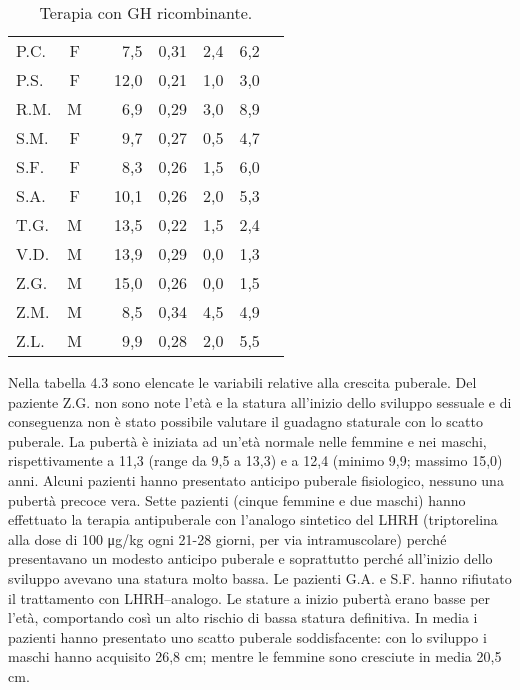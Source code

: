\begin{table}[!h]
\begin{center}
\begin{tabular}{lccrcccl}
P.C.	& F &  		 & 7,5   	&  0,31     	& 2,4                 & 6,2  \\
P.S.	& F &  		 & 12,0  	&  0,21     	& 1,0                 & 3,0  \\
R.M.	& M & \checkmark & 6,9   	&  0,29     	& 3,0                 & 8,9  \\
S.M.	& F &  	  	 & 9,7   	&  0,27     	& 0,5                 & 4,7  \\
S.F.	& F &  		 & 8,3   	&  0,26     	& 1,5                 & 6,0  \\
S.A.	& F &  		 & 10,1  	&  0,26     	& 2,0                 & 5,3  \\
T.G.    & M &            & 13,5         &  0,22         & 1,5                 & 2,4  \\
V.D.	& M &  		 & 13,9  	&  0,29     	& 0,0                 & 1,3  \\
Z.G.	& M &  		 & 15,0  	&  0,26     	& 0,0                 & 1,5  \\
Z.M.	& M &  		 & 8,5   	&  0,34     	& 4,5                 & 4,9  \\
Z.L.	& M &  		 & 9,9   	&  0,28     	& 2,0                 & 5,5  \\
\bottomrule
\end{tabular}
\end{center}
\caption{Terapia con GH ricombinante.}
\label{tab:Terapia}
\end{table}

Nella tabella 4.3 sono elencate le variabili relative alla crescita puberale. Del paziente Z.G. non sono note l'età e la statura all'inizio dello sviluppo sessuale e di conseguenza non è stato possibile valutare il guadagno staturale con lo scatto puberale.
La pubertà è iniziata ad un'età normale nelle femmine e nei maschi, rispettivamente a 11,3 (range da 9,5 a 13,3) e a 12,4 (minimo 9,9; massimo 15,0) anni. 
Alcuni pazienti hanno presentato anticipo puberale fisiologico, nessuno una pubertà precoce vera. 
Sette pazienti (cinque femmine e due maschi) hanno effettuato la terapia antipuberale con  l'analogo sintetico del LHRH (triptorelina alla dose di 100 \unit{\micro g}/kg ogni 21-28 giorni, per via intramuscolare) perché presentavano un modesto anticipo puberale e soprattutto perché all'inizio dello sviluppo avevano una statura molto bassa. Le pazienti G.A. e S.F. hanno rifiutato il trattamento con LHRH--analogo.
Le stature a inizio pubertà erano basse per l'età, comportando così un alto rischio di bassa statura definitiva.
In media i pazienti hanno presentato uno scatto puberale soddisfacente: con lo sviluppo i maschi hanno acquisito 26,8 cm; mentre le femmine sono cresciute in media 20,5 cm. 
 
